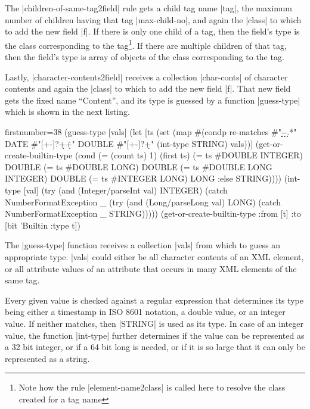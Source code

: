 \documentclass[submission]{eptcs}
\newcommand{\code}{\clojureinline}
\begin{document}
The \code|children-of-same-tag2field| rule gets a child tag name \code|tag|,
the maximum number of children having that tag \code|max-child-no|, and again
the \code|class| to which to add the new field \code|f|.  If there is only one
child of a tag, then the field's type is the class corresponding to the
tag\footnote{Note how the rule \code|element-name2class| is called here to
  resolve the class created for a tag name}.  If there are multiple children of
that tag, then the field's type is array of objects of the class corresponding
to the tag.

Lastly, \code|character-contents2field| receives a collection \code|char-conts|
of character contents and again the \code|class| to which to add the new field
\code|f|.  That new field gets the fixed name ``Content'', and its type is
guessed by a function \code|guess-type| which is shown in the next listing.

\begin{clojurecode*}{firstnumber=38}
  (guess-type [vals]
   (let [ts (set (map #(condp re-matches %
                         #"\d\d\d\d-\d\d-\d\d.*" DATE
                         #"[+-]?\d+\.\d+"        DOUBLE
                         #"[+-]?\d+"             (int-type %
                         STRING) vals))]
     (get-or-create-builtin-type
      (cond
       (= (count ts) 1)              (first ts)
       (= ts #{DOUBLE INTEGER})      DOUBLE
       (= ts #{DOUBLE LONG})         DOUBLE
       (= ts #{DOUBLE LONG INTEGER}) DOUBLE
       (= ts #{INTEGER LONG})        LONG
       :else                         STRING))))
  (int-type [val]
   (try (and (Integer/parseInt val) INTEGER)
        (catch NumberFormatException _
          (try (and (Long/parseLong val) LONG)
               (catch NumberFormatException _
                 STRING)))))
  (get-or-create-builtin-type
   :from [t]
   :to   [bit 'Builtin {:type t}])
\end{clojurecode*}

The \code|guess-type| function receives a collection \code|vals| from which to
guess an appropriate type.  \code|vals| could either be all character contents
of an XML element, or all attribute values of an attribute that occurs in many
XML elements of the same tag.

Every given value is checked against a regular expression that determines its
type being either a timestamp in ISO 8601 notation, a double value, or an
integer value.  If neither matches, then \code|STRING| is used as its type.  In
case of an integer value, the function \code|int-type| further determines if
the value can be represented as a 32 bit integer, or if a 64 bit long is
needed, or if it is so large that it can only be represented as a string.
\end{document}
